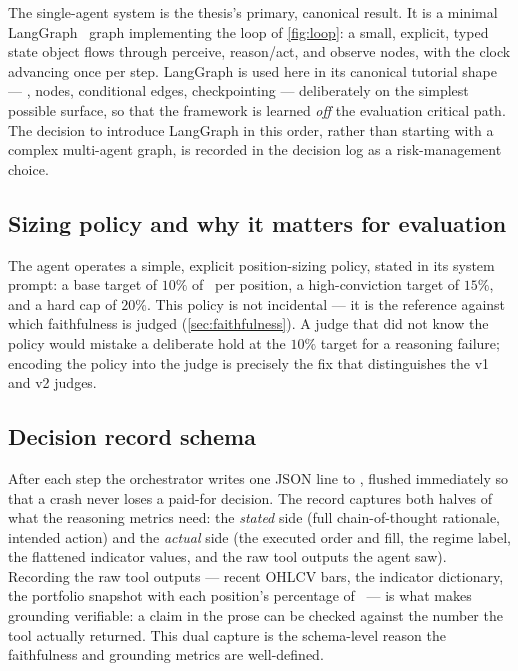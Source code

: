 The single-agent system is the thesis's primary, canonical result. It is a minimal
LangGraph~\cite{langgraph2024} graph implementing the loop of \cref{fig:loop}: a small,
explicit, typed state object flows through perceive, reason/act, and observe nodes, with the
clock advancing once per step. LangGraph is used here in its canonical tutorial shape ---
, nodes, conditional edges, checkpointing --- deliberately on the simplest
possible surface, so that the framework is learned \emph{off} the evaluation critical path.
The decision to introduce LangGraph in this order, rather than starting with a complex
multi-agent graph, is recorded in the decision log as a risk-management choice.

\subsection{Sizing policy and why it matters for evaluation}

The agent operates a simple, explicit position-sizing policy, stated in its system prompt: a
base target of $10\%$ of \nav\ per position, a high-conviction target of $15\%$, and a hard
cap of $20\%$. This policy is not incidental --- it is the reference against which
faithfulness is judged (\cref{sec:faithfulness}). A judge that did not know the policy would
mistake a deliberate hold at the $10\%$ target for a reasoning failure; encoding the policy
into the judge is precisely the fix that distinguishes the v1 and v2 judges.

\subsection{Decision record schema}

After each step the orchestrator writes one JSON line to , flushed
immediately so that a crash never loses a paid-for decision. The record captures both halves
of what the reasoning metrics need: the \emph{stated} side (full chain-of-thought rationale,
intended action) and the \emph{actual} side (the executed order and fill, the regime label,
the flattened indicator values, and the raw tool outputs the agent saw). Recording the raw
tool outputs --- recent OHLCV bars, the indicator dictionary, the portfolio snapshot with
each position's percentage of \nav\ --- is what makes grounding verifiable: a claim in the
prose can be checked against the number the tool actually returned. This dual capture is the
schema-level reason the faithfulness and grounding metrics are well-defined.

